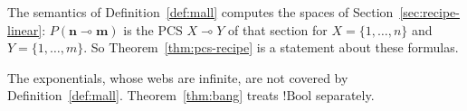 The semantics of Definition~\ref{def:mall} computes the spaces of
Section~\ref{sec:recipe-linear}: $P(\mathbf{n} \multimap \mathbf{m})$ is
the PCS $X \multimap Y$ of that section for $X = \{1,\dots,n\}$ and
$Y = \{1,\dots,m\}$. So
Theorem~\ref{thm:pcs-recipe} is a statement about these
formulas.

The exponentials, whose
webs are infinite, are not covered by Definition~\ref{def:mall}.
Theorem~\ref{thm:bang} treats $!\mathrm{Bool}$ separately.
